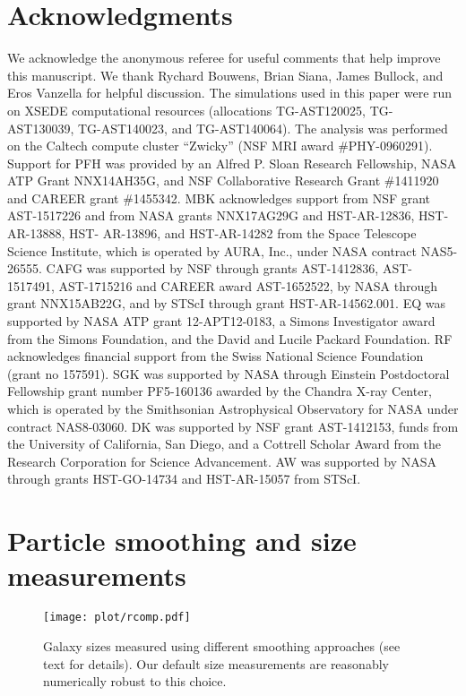 \documentclass[useAMS,usenatbib]{mn2e}
\begin{document}
\section*{Acknowledgments}
We acknowledge the anonymous referee for useful comments that help improve this manuscript. 
We thank Rychard Bouwens, Brian Siana, James Bullock, and Eros Vanzella for helpful discussion. 
The simulations used in this paper were run on XSEDE computational resources (allocations TG-AST120025, TG-AST130039, TG-AST140023, and TG-AST140064). 
The analysis was performed on the Caltech compute cluster ``Zwicky'' (NSF MRI award \#PHY-0960291).
Support for PFH was provided by an Alfred P. Sloan Research Fellowship, NASA ATP Grant NNX14AH35G, and NSF Collaborative Research Grant \#1411920 and CAREER grant \#1455342.
MBK acknowledges support from NSF grant AST-1517226 and from NASA grants NNX17AG29G and HST-AR-12836, HST-AR-13888, HST- AR-13896, and HST-AR-14282 from the Space Telescope Science Institute, which is operated by AURA, Inc., under NASA contract NAS5-26555.
CAFG was supported by NSF through grants AST-1412836, AST-1517491, AST-1715216 and CAREER award AST-1652522, by NASA through grant NNX15AB22G, and by STScI through grant HST-AR-14562.001.
EQ was supported by NASA ATP grant 12-APT12-0183, a Simons Investigator award from the Simons Foundation, and the David and Lucile Packard Foundation.
RF acknowledges financial support from the Swiss National Science Foundation (grant no 157591).
SGK was supported by NASA through Einstein Postdoctoral Fellowship grant number PF5-160136 awarded by the Chandra X-ray Center, which is operated by the Smithsonian Astrophysical Observatory for NASA under contract NAS8-03060.
DK was supported by NSF grant AST-1412153, funds from the University of California, San Diego, and a Cottrell Scholar Award from the Research Corporation for Science Advancement. 
AW was supported by NASA through grants HST-GO-14734 and HST-AR-15057 from STScI.




\appendix

\section{Particle smoothing and size measurements}
\label{sec:append}

\begin{figure}
\centering
\texttt{[image: plot/rcomp.pdf]}
\caption{Galaxy sizes measured using different smoothing approaches (see text for details). Our default size measurements are reasonably numerically robust to this choice.}
\label{fig:rcomp}
\end{figure}
\end{document}
